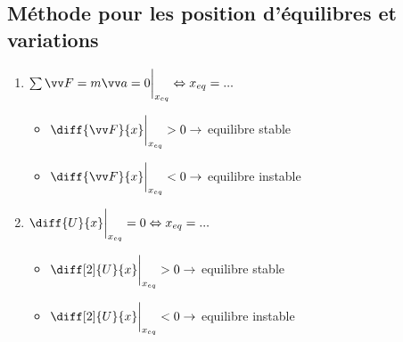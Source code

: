 \documentclass[../main.tex]{subfiles}
\begin{document}
\subsection{Méthode pour les position d'équilibres et variations}
\begin{enumerate}
  \item \( \sum\F = m\ac = 0 \eva_{x_{eq}} \Leftrightarrow x_{eq} = ... \)
    \begin{itemize}
      \item \( \diff{\F}{x}\eva_{x_{eq}} > 0 \rightarrow \) equilibre stable
      \item \( \diff{\F}{x}\eva_{x_{eq}} < 0 \rightarrow \) equilibre instable
    \end{itemize}
  \item \( \diff{U}{x}\eva_{x_{eq}} = 0  \Leftrightarrow x_{eq} = ... \)
    \begin{itemize}
      \item \( \diff[2]{U}{x}\eva_{x_{eq}} > 0 \rightarrow \) equilibre stable
      \item \( \diff[2]{U}{x}\eva_{x_{eq}} < 0 \rightarrow \) equilibre instable
    \end{itemize}
\end{enumerate}
\end{document}
